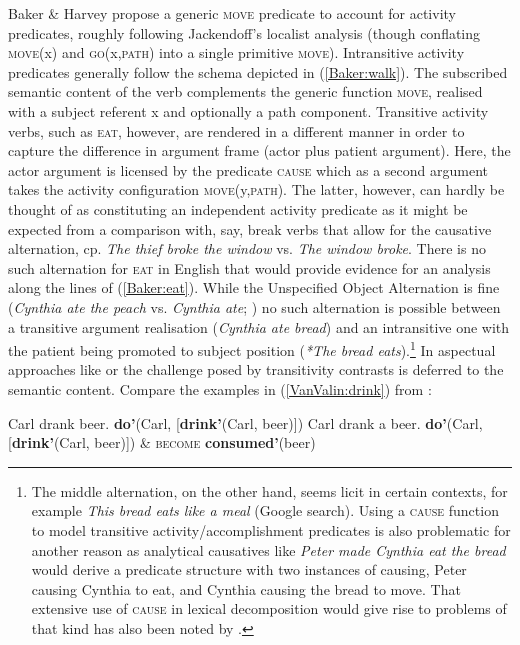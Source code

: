 Baker \& Harvey propose a generic \textsc{move} predicate to account for activity predicates, roughly following Jackendoff's  localist analysis (though conflating \textsc{move}(x) and \textsc{go}(x,\textsc{path}) into a single primitive \textsc{move}). Intransitive activity predicates generally follow the schema depicted in (\ref{Baker:walk}). The subscribed semantic content of the verb complements the generic function \textsc{move}, realised with a subject referent x and optionally a path component. Transitive activity verbs, such as \textsc{eat}, however, are rendered in a different manner in order to capture the difference in argument frame (actor plus patient argument). Here, the actor argument is licensed by the predicate \textsc{cause} which as a second argument takes the activity configuration \textsc{move}(y,\textsc{path}). The latter, however, can hardly be thought of as constituting an independent activity predicate as it might be expected from a comparison with, say, break verbs that allow for the causative alternation, cp. \textit{The thief broke the window} vs. \textit{The window broke}. There is no such alternation for \textsc{eat} in English that would provide evidence for an analysis along the lines of (\ref{Baker:eat}). While the Unspecified Object Alternation is fine (\textit{Cynthia ate the peach} vs. \textit{Cynthia ate}; \citealt[213]{Levin1993}) no such alternation is possible between a transitive argument realisation (\textit{Cynthia ate bread}) and an intransitive one with the patient being promoted to subject position (\textit{*The bread eats}).\footnote{The middle alternation, on the other hand, seems licit in certain contexts, for example \textit{This bread eats like a meal} (Google search). Using a \textsc{cause} function to model transitive activity/accomplishment predicates is also problematic for another reason as analytical causatives like \textit{Peter made Cynthia eat the bread} would derive a predicate structure with two instances of causing, Peter causing Cynthia to eat, and Cynthia causing the bread to move. That extensive use of \textsc{cause} in lexical decomposition would give rise to problems of that kind has also been noted by \citet{Jackendoff1990}.} In aspectual approaches like \citet{rappaport1998building} or \citet{van1997syntax} the challenge posed by transitivity contrasts is deferred to the semantic content. Compare the examples in (\ref{VanValin:drink}) from \citet[111]{van1997syntax}:

\ea \label{VanValin:drink}
\ea Carl drank beer. \label{VanValin:drinka}
 \textbf{do'}(Carl, [\textbf{drink'}(Carl, beer)])
\ex Carl drank a beer. \label{VanValin:drinkb}
 \textbf{do'}(Carl, [\textbf{drink'}(Carl, beer)]) \& \textsc{become} \textbf{consumed'}(beer)
\z
\z

